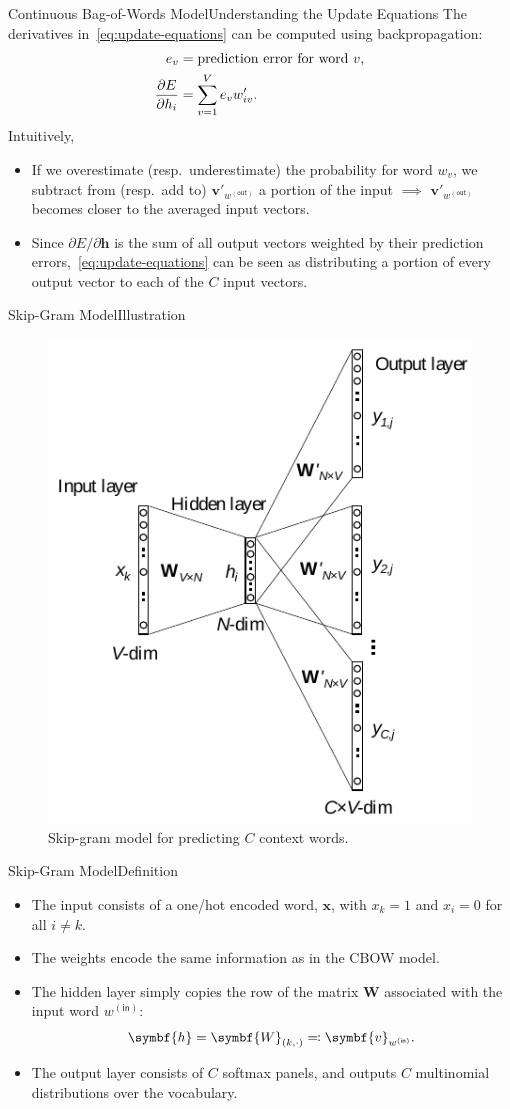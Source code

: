 \documentclass[usepdftitle=false]{beamer}
\theoremstyle{definition}
\renewcommand*{\vec}{\symbf}%
\newcommand*{\mat}{\symbf}%
\newcommand*{\ins}{\mathsf{(in)}}
\newcommand*{\outs}{\mathsf{(out)}}
\begin{document}
\begin{frame}{Continuous Bag-of-Words Model}{Understanding the Update
    Equations}
  The derivatives in~\eqref{eq:update-equations} can be computed using
  backpropagation:
  \begin{align*}
    e_v &= \text{prediction error for word}\ v\text,\\
    \frac{\partial E}{\partial h_i} &= \sum\limits_{v = 1}^{V} e_v w'_{i v}\text.
  \end{align*}
  Intuitively,
  \begin{itemize}
  \item If we overestimate (resp.\ underestimate) the probability for
    word \(w_v\), we subtract from (resp.\ add to)
    \(\vec{v}'_{w^{\outs}}\) a portion of the input \(\implies\)
    \(\vec{v}'_{w^{\outs}}\) becomes closer to the averaged input
    vectors.
  \item Since \(\partial E / {\partial \vec{h}}\) is the sum of all
    output vectors weighted by their prediction
    errors,~\eqref{eq:update-equations} can be seen as distributing a
    portion of every output vector to each of the \(C\) input vectors.
  \end{itemize}
\end{frame}

\begin{frame}{Skip-Gram Model}{Illustration}
  \begin{figure}
    \centering
    \includegraphics[width=.4\textwidth]{Skip-Gram.pdf}
    \caption{Skip-gram model for predicting \(C\) context words.}
  \end{figure}
\end{frame}

\begin{frame}{Skip-Gram Model}{Definition}
  \begin{itemize}
  \item The input consists of a one\-/hot encoded word, \(\vec{x}\),
    with \(x_k = 1\) and \(x_i = 0\) for all \(i \ne k\).
  \item The weights encode the same information as in the CBOW model.
  \item The hidden layer simply copies the row of the matrix
    \(\mat{W}\) associated with the input word \(w^{\ins}\):
    \[
      \vec{h} = \mat{W}_{(k, \cdot)} \eqqcolon
      \vec{v}_{w^{\ins}}\text.
    \]
  \item The output layer consists of \(C\) softmax panels, and outputs
    \(C\) multinomial distributions over the vocabulary.
  \end{itemize}
\end{frame}
\end{document}
